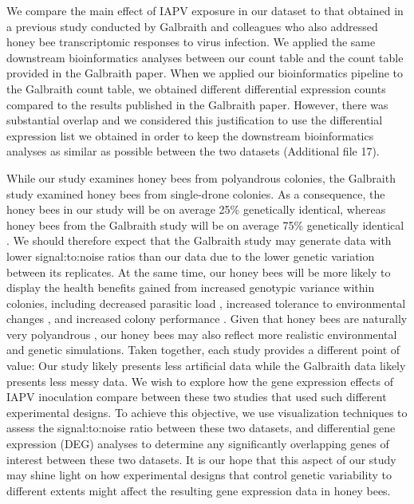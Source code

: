 \documentclass{bmcart}
\begin{document}
\begin{linenumbers}
\begin{doublespacing}
We compare the main effect of IAPV exposure in our dataset to that obtained in a previous study conducted by Galbraith and colleagues \cite{galbraith} who also addressed honey bee transcriptomic responses to virus infection. We applied the same downstream bioinformatics analyses between our count table and the count table provided in the Galbraith paper. When we applied our bioinformatics pipeline to the Galbraith count table, we obtained different differential expression counts compared to the results published in the Galbraith paper. However, there was substantial overlap and we considered this justification to use the differential expression list we obtained in order to keep the downstream bioinformatics analyses as similar as possible between the two datasets (Additional file 17). 

While our study examines honey bees from polyandrous colonies, the Galbraith study examined honey bees from single-drone colonies. As a consequence, the honey bees in our study will be on average 25\% genetically identical, whereas honey bees from the Galbraith study will be on average 75\% genetically identical \cite{sisters}. We should therefore expect that the Galbraith study may generate data with lower signal:to:noise ratios than our data due to the lower genetic variation between its replicates. At the same time, our honey bees will be more likely to display the health benefits gained from increased genotypic variance within colonies, including decreased parasitic load \cite{multParasite}, increased tolerance to environmental changes \cite{divHyp2}, and increased colony performance \cite{geneticDiverse, geneticDiverse2}. Given that honey bees are naturally very polyandrous \cite{patriline}, our honey bees may also reflect more realistic environmental and genetic simulations. Taken together, each study provides a different point of value: Our study likely presents less artificial data while the Galbraith data likely presents less messy data. We wish to explore how the gene expression effects of IAPV inoculation compare between these two studies that used such different experimental designs. To achieve this objective, we use visualization techniques to assess the signal:to:noise ratio between these two datasets, and differential gene expression (DEG) analyses to determine any significantly overlapping genes of interest between these two datasets. It is our hope that this aspect of our study may shine light on how experimental designs that control genetic variability to different extents might affect the resulting gene expression data in honey bees.


\end{doublespacing}
\end{linenumbers}
\end{document}
